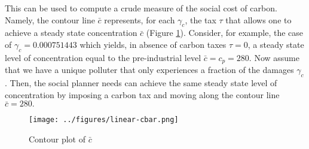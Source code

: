 \documentclass[../../main.tex]{subfiles}
\begin{document}
This can be used to compute a crude measure of the social cost of carbon. Namely, the contour line $\bar{c}$ represents, for each $\gamma_c$, the tax $\tau$ that allows one to achieve a steady state concentration $\bar{c}$ (Figure \ref{fig:linear-cbar}). Consider, for example, the case of $\gamma_c = 0.000751443$ which yields, in absence of carbon taxes $\tau = 0$, a steady state level of concentration equal to the pre-industrial level $\bar{c} = c_p = 280$. Now assume that we have a unique polluter that only experiences a fraction of the damages $\gamma_c$. Then, the social planner needs can achieve the same steady state level of concentration by imposing a carbon tax and moving along the contour line $\bar{c} = 280.$

\begin{figure}[H]
    \centering
    \texttt{[image: ../figures/linear-cbar.png]}
    \caption{Contour plot of $\bar{c}$}
    \label{fig:linear-cbar}
\end{figure}
\end{document}
